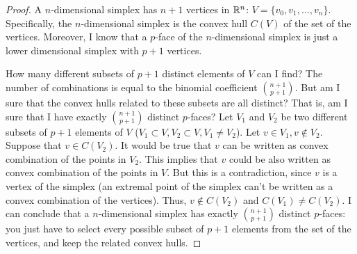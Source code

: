 \begin{proof}
    A \(n\)-dimensional simplex has \(n+1\) vertices in \(\mathbb{R}^n\): \(V = \{v_0, v_1, \dots, v_n\}\). Specifically, the \(n\)-dimensional simplex is the convex hull \(C(V)\) of the set of the vertices. Moreover, I know that a \(p\)-face of the \(n\)-dimensional simplex is just a lower dimensional simplex with \(p+1\) vertices.\par
    How many different subsets of \(p+1\) distinct elements of \(V\) can I find? The number of combinations is equal to the binomial coefficient \(\binom{n+1}{p+1}\). But am I sure that the convex hulls related to these subsets are all distinct? That is, am I sure that I have exactly \(\binom{n+1}{p+1}\) distinct \(p\)-faces?
    Let \(V_1\) and \(V_2\) be two different subsets of \(p+1\) elements of \(V\) (\(V_1 \subset V, V_2 \subset V, V_1 \ne V_2\)). Let \(v \in V_1, v \notin V_2\). Suppose that \(v \in C(V_2)\). It would be true that \(v\) can be written as convex combination of the points in \(V_2\). This implies that \(v\) could be also written as convex combination of the points in \(V\). But this is a contradiction, since \(v\) is a vertex of the simplex (an  extremal point of the simplex can't be written as a convex combination of the vertices). Thus, \(v \notin C(V_2)\) and \(C(V_1) \neq C(V_2)\). I can conclude that a \(n\)-dimensional simplex has exactly \(\binom{n+1}{p+1}\) distinct \(p\)-faces: you just have to select every possible subset of \(p+1\) elements from the set of the vertices, and keep the related convex hulls.
\end{proof}